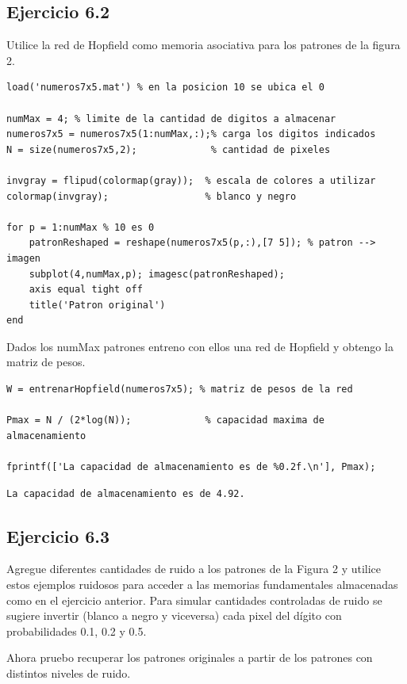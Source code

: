 \documentclass[11pt,a4paper,final]{article}
\begin{document}
\subsection{Ejercicio 6.2}

Utilice la red de Hopfield como memoria asociativa para los patrones de la figura 2.

\begin{verbatim}
load('numeros7x5.mat') % en la posicion 10 se ubica el 0

numMax = 4; % limite de la cantidad de digitos a almacenar
numeros7x5 = numeros7x5(1:numMax,:);% carga los digitos indicados
N = size(numeros7x5,2);             % cantidad de pixeles

invgray = flipud(colormap(gray));  % escala de colores a utilizar
colormap(invgray);                 % blanco y negro

for p = 1:numMax % 10 es 0
    patronReshaped = reshape(numeros7x5(p,:),[7 5]); % patron --> imagen
    subplot(4,numMax,p); imagesc(patronReshaped);
    axis equal tight off
    title('Patron original')
end
\end{verbatim}

Dados los numMax patrones entreno con ellos una red de Hopfield y obtengo la matriz de pesos.

\begin{verbatim}
W = entrenarHopfield(numeros7x5); % matriz de pesos de la red

Pmax = N / (2*log(N));             % capacidad maxima de almacenamiento

fprintf(['La capacidad de almacenamiento es de %0.2f.\n'], Pmax);
\end{verbatim}

\begin{verbatim}La capacidad de almacenamiento es de 4.92.
\end{verbatim} \color{black}
    

\subsection{Ejercicio 6.3}

Agregue diferentes cantidades de ruido a los patrones de la Figura 2 y utilice estos ejemplos ruidosos para acceder a las memorias fundamentales almacenadas como en el ejercicio anterior. Para simular cantidades controladas de ruido se sugiere invertir (blanco a negro y viceversa) cada pixel del dígito con probabilidades 0.1, 0.2 y 0.5.


Ahora pruebo recuperar los patrones originales a partir de los patrones con distintos niveles de ruido.
\end{document}
